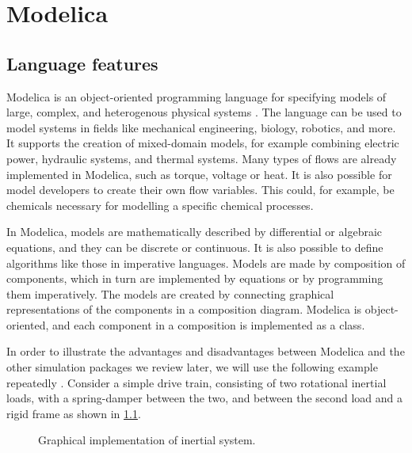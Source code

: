 \documentclass[\rootfolder/main.tex]{subfiles}
\begin{document}
\chapter{Modelica} %

\label{Chapter02} %

\section{Language features}

Modelica is an object-oriented programming language for specifying models of large, complex, and heterogenous physical systems \cite{clauss2002}.
The language can be used to model systems in fields like mechanical engineering, biology, robotics, and more.
It supports the creation of mixed-domain models, for example combining electric power, hydraulic systems, and thermal systems.
Many types of flows are already implemented in Modelica, such as torque, voltage or heat.
It is also possible for model developers to create their own flow variables.
This could, for example, be chemicals necessary for modelling a specific chemical processes.

In Modelica, models are mathematically described by differential or algebraic equations, and they can be discrete or continuous.
It is also possible to define algorithms like those in imperative languages.
Models are made by composition of components, which in turn are implemented by equations or by programming them imperatively.
The models are created by connecting graphical representations of the components in a composition diagram.
Modelica is object-oriented, and each component in a composition is implemented as a class.

In order to illustrate the advantages and disadvantages between Modelica and the other simulation packages we review later, we will use the following example repeatedly \footnotemark.
Consider a simple drive train, consisting of two rotational inertial loads, with a spring-damper between the two, and between the second load and a rigid frame as shown in \cref{fig:modelica-inertial}.


\begin{figure}[ht]
    \caption{Graphical implementation of inertial system.\label{fig:modelica-inertial}}
\end{figure}
\end{document}
